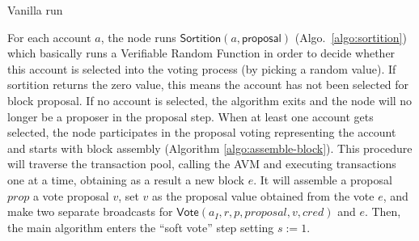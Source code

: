 \documentclass[10pt,a4paper]{article}
\begin{document}
\begin{section}{Vanilla run}
    
    For each account $a$, the node runs $\mathsf{Sortition}(a, \mathsf{proposal})$ (Algo.~\ref{algo:sortition}) 
    which basically runs a Verifiable Random Function in order to decide whether 
    this account is selected into the voting process (by picking a random value).
    If sortition returns the zero value, this means the account has not been selected for block proposal. 
    If no account is selected, the algorithm exits and the node will no longer be a proposer in the proposal 
    step.
    When at least one account gets selected, the node participates in the proposal voting representing 
    the account and starts with block assembly (Algorithm \ref{algo:assemble-block}).
    This procedure will traverse the transaction pool, calling the AVM and executing 
    transactions one at a time, obtaining as a result a new block $e$. 
    It will assemble a proposal $prop$ a vote proposal $v$,
    set $v$ as the proposal value obtained from the vote $e$, 
    and make two separate broadcasts for $\mathsf{Vote}(a_I, r,p, proposal, v, cred)$ 
    and $e$.
    Then, the main algorithm enters the ``soft vote'' step setting $s:=1$.
    

\end{section}
\end{document}
